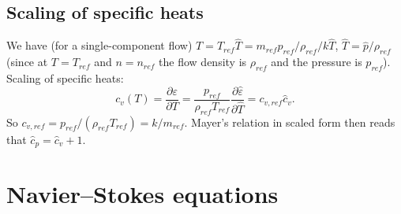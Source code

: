 \documentclass[a4paper,11pt,english]{article}
\begin{document}
\subsection{Scaling of specific heats}
We have (for a single-component flow) $T=T_{ref} \hat{T} = m_{ref} p_{ref} / \rho_{ref} / k \hat{T}$, $\hat{T} = \hat{p}/\rho_{ref}$ (since at $T=T_{ref}$ and $n=n_{ref}$ the flow density is $\rho_{ref}$ and the pressure is $p_{ref}$).
Scaling of specific heats:
\begin{equation}
    c_v(T) = \frac{\partial \varepsilon}{\partial T} = \frac{p_{ref}}{\rho_{ref}T_{ref}}\frac{\partial \hat{\varepsilon}}{\partial \hat{T}}=c_{v,ref} \hat{c}_{v}.
\end{equation}
So $c_{v,ref}=p_{ref} / (\rho_{ref}T_{ref}) = k / m_{ref}$. Mayer's relation in scaled form then reads that $\hat{c}_p = \hat{c}_v + 1$.

\section{Navier--Stokes equations}
\end{document}
